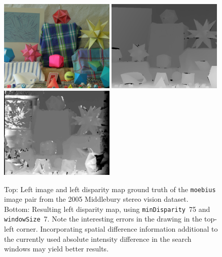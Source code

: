 \documentclass[english, paper=a4]{scrartcl}
\begin{document}
\begin{figure}[H]
\centering
\includegraphics[width=0.49\textwidth]{moebius_left.png}
\label{fig:moebius_left}
\includegraphics[width=0.49\textwidth]{moebius_groundtruth_left.png}
\label{fig:moebius_groundtruth_left}
\includegraphics[width=0.49\textwidth]{moebius_result_left_winsize7_mindisp75.png}
\label{fig:moebius_result_left_winsize7_mindisp75}
\caption{Top: Left image and left disparity map ground truth of the \texttt{moebius} image pair from the 2005 Middlebury stereo vision dataset.\\
Bottom: Resulting left disparity map, using \texttt{minDisparity}~75 and \texttt{windowSize}~7. Note the interesting errors in the drawing in the top-left corner. Incorporating spatial difference information additional to the currently used absolute intensity difference in the search windows may yield better results.}
\end{figure}
\end{document}

